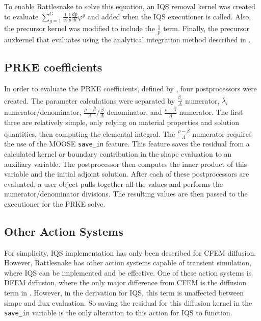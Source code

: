 To enable Rattlesnake to solve this equation, an IQS removal kernel was created to evaluate $\sum_{g=1}^G\frac{1}{v^g}\frac{1}{p}\frac{dp}{dt}\varphi^g$ and added when the IQS executioner is called.  Also, the precursor kernel was modified to include the $\frac{1}{p}$ term. Finally, the precursor auxkernel that evaluates  using the analytical integration method described in .

\subsection{PRKE coefficients}

In order to evaluate the PRKE coefficients, defined by , four postprocessors were created.  The parameter calculations were separated by $\frac{\bar{\beta}_i}{\Lambda}$ numerator, $\bar{\lambda}_i$ numerator/denominator, $\frac{\rho-\bar{\beta}}{\Lambda}/\frac{\bar{\beta}}{\Lambda}$ denominator, and $\frac{\rho-\bar{\beta}}{\Lambda}$ numerator. The first three are relatively simple, only relying on material properties and solution quantities, then computing the elemental integral.  The $\frac{\rho-\bar{\beta}}{\Lambda}$ numerator requires the use of the MOOSE \texttt{save\_in} feature. This feature saves the residual from a calculated kernel or boundary contribution in the shape evaluation to an auxiliary variable.  The postprocessor then computes the inner product of this variable and the initial adjoint solution.  After each of these postprocessors are evaluated, a user object pulls together all the values and performs the numerator/denominator divisions.  The resulting values are then passed to the executioner for the PRKE solve.

\subsection{Other Action Systems}

For simplicity, IQS implementation has only been described for CFEM diffusion.  However, Rattlesnake has other action systems capable of transient simulation, where IQS can be implemented and be effective.  One of these action systems is DFEM diffusion, where the only major difference from CFEM is the diffusion term in .  However, in the derivation for IQS, this term is unaffected between shape and flux evaluation.  So saving the residual for this diffusion kernel in the \texttt{save\_in} variable is the only alteration to this action for IQS to function.

